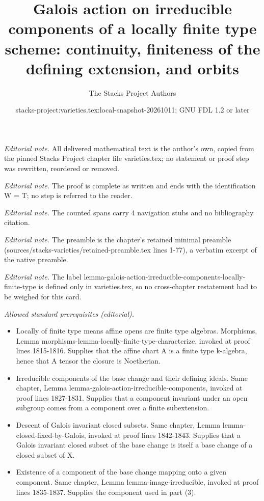 \documentclass[10pt,a4paper]{amsart}
\title{Galois action on irreducible components of a locally finite type scheme: continuity, finiteness of the defining extension, and orbits}
\author{The Stacks Project Authors}
\date{stacks-project:varieties.tex:local-snapshot-20261011; GNU FDL 1.2 or later}
\theoremstyle{plain}
\theoremstyle{definition}
\theoremstyle{remark}
\numberwithin{equation}{subsection}
\begin{document}
\maketitle
\noindent\textit{Editorial note.} All delivered mathematical text is the author's own, copied from the pinned Stacks Project chapter file varieties.tex; no statement or proof step was rewritten, reordered or removed.\par\medskip
\noindent\textit{Editorial note.} The proof is complete as written and ends with the identification W = T; no step is referred to the reader.\par\medskip
\noindent\textit{Editorial note.} The counted spans carry 4 navigation stubs and no bibliography citation.\par\medskip
\noindent\textit{Editorial note.} The preamble is the chapter's retained minimal preamble (sources/stacks-varieties/retained-preamble.tex lines 1-77), a verbatim excerpt of the native preamble.\par\medskip
\noindent\textit{Editorial note.} The label lemma-galois-action-irreducible-components-locally-finite-type is defined only in varieties.tex, so no cross-chapter restatement had to be weighed for this card.\par\medskip
\noindent\textit{Allowed standard prerequisites (editorial).}\begin{itemize}
\item Locally of finite type means affine opens are finite type algebras. Morphisms, Lemma morphisms-lemma-locally-finite-type-characterize, invoked at proof lines 1815-1816. Supplies that the affine chart A is a finite type k-algebra, hence that A tensor the closure is Noetherian.
\item Irreducible components of the base change and their defining ideals. Same chapter, Lemma lemma-galois-action-irreducible-components, invoked at proof lines 1827-1831. Supplies that a component invariant under an open subgroup comes from a component over a finite subextension.
\item Descent of Galois invariant closed subsets. Same chapter, Lemma lemma-closed-fixed-by-Galois, invoked at proof lines 1842-1843. Supplies that a Galois invariant closed subset of the base change is itself a base change of a closed subset of X.
\item Existence of a component of the base change mapping onto a given component. Same chapter, Lemma lemma-image-irreducible, invoked at proof lines 1835-1837. Supplies the component used in part (3).
\end{itemize}\medskip
\end{document}
